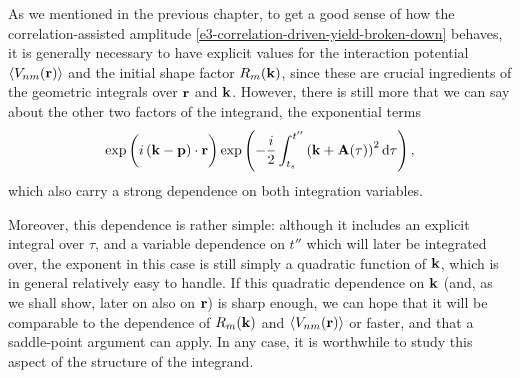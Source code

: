 As we mentioned in the previous chapter, to get a good sense of how the correlation-assisted amplitude \eqref{e3-correlation-driven-yield-broken-down} behaves, it is generally necessary to have explicit values for the interaction potential $\left\langle V_{nm}\mathopen{}\left( \vb{r} \right)\mathclose{} \right\rangle$ and the initial shape factor $R_m(\vb{k})$, since these are crucial ingredients of the geometric integrals over $\vb{r}$ and $\vb{k}$. However, there is still more that we can say about the other two factors of the integrand, the exponential terms
\begin{equation}
\exp\left(\vphantom{\int} i\left(\vb{k}-\vb{p}\right)\cdot\vb{r} \right)
\exp\left( -\frac{i}{2} \int_{{t_s}}^{t''}\left(\vb{k}+\vb{A}(\tau)\right)^2\mathrm{d}\tau \right)
,
\label{e3-exponential-factors}
\end{equation}
which also carry a strong dependence on both integration variables.

Moreover, this dependence is rather simple: although it includes an explicit integral over $\tau$, and a variable dependence on $t''$ which will later be integrated over, the exponent in this case is still simply a quadratic function of $\vb{k}$, which is in general relatively easy to handle. If this quadratic dependence on $\vb{k}$ (and, as we shall show, later on also on $\vb{r}$) is sharp enough, we can hope that it will be comparable to the dependence of $R_m(\vb{k})$ and $\left\langle V_{nm}\mathopen{}\left( \vb{r} \right)\mathclose{} \right\rangle$ or faster, and that a saddle-point argument can apply. In any case, it is worthwhile to study this aspect of the structure of the integrand.


